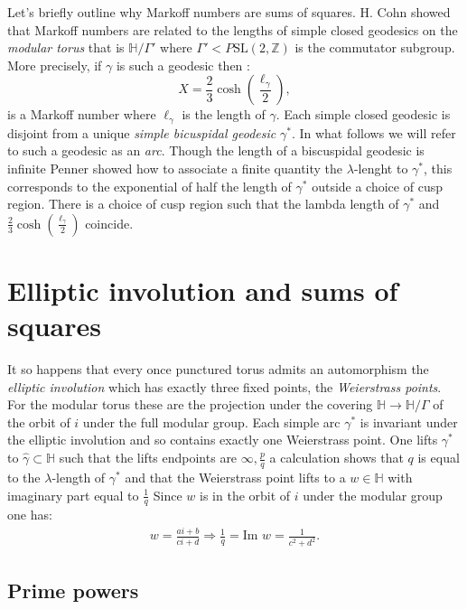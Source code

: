 \documentclass[14pt,a4paper]{amsart}
\def\HH{\mathbb{H}}
\def\ZZ{\mathbb{Z}}
\def\sl2{\mathrm{SL}(2, \ZZ)}
\begin{document}
Let's briefly outline why Markoff numbers are sums of squares.
H. Cohn showed that Markoff numbers are related to the 
 lengths of simple closed geodesics on the \textit{modular torus}
 that is $\HH/\Gamma'$ 
 where $\Gamma' < P\sl2$ is the commutator subgroup.
 More precisely, if $\gamma$ is such a geodesic then :
 \begin{equation}
 X  = \frac{2}{3} \cosh \left( \frac{\ell_\gamma}{2}\right),
 \end{equation}
 is a Markoff number where $\ell_\gamma$ is the length of $\gamma$.
 Each simple closed geodesic is disjoint from a unique
 \textit{simple bicuspidal geodesic} $\gamma^*$. In what follows we
 will refer to such a geodesic as an \textit{arc}.
 Though the length of a biscuspidal geodesic is infinite Penner
 showed how to associate a finite quantity the $\lambda$-lenght to
 $\gamma^*$, this corresponds to the exponential of half the length of $\gamma^*$ outside a choice of cusp region.
 There is a choice of cusp region such that the lambda length of
 $\gamma^*$ and $\frac{2}{3} \cosh \left( \frac{\ell_\gamma}{2}\right)$
 coincide.

 \section{Elliptic involution and sums of squares} It so happens that every once punctured torus admits an
 automorphism the \textit{elliptic involution} which has exactly
 three fixed points, the \textit{Weierstrass points}.
 For the modular torus these are the projection
 under the covering $\mathbb{H} \to \mathbb{H}/\Gamma$ of the orbit of $i$ under the full modular group.
 Each simple arc $\gamma^*$ is invariant under the elliptic
 involution and so contains exactly one Weierstrass point.
 One lifts $\gamma^*$ to $\hat{\gamma} \subset\mathbb{H}$ 
 such that the lifts endpoints are $\infty, \frac{p}{q}$
 a calculation shows that $q$ is equal to the $\lambda$-length of
 $\gamma^*$ and that the Weierstrass point lifts to a $w\in
 \mathbb{H}$ with imaginary part equal to $\frac{1}{q}$
 Since $w$ is in the orbit of $i$ under the modular group one has:
 \begin{eqnarray*}
	 w = \frac{ai + b}{ci + d} \Rightarrow \frac{1}{q} = \text{Im } w = 
	 \frac{1}{c^2 + d^2}. 
 \end{eqnarray*}




 \subsection{Prime powers}
\end{document}
